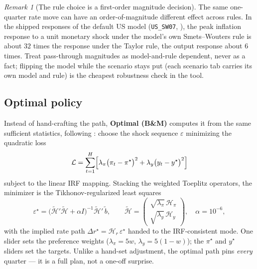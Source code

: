 \documentclass[11pt]{article}
\newcommand{\ui}[1]{\textbf{#1}}
\theoremstyle{plain}
\theoremstyle{remark}
\newtheorem{remark}{Remark}
\begin{document}
\begin{remark}[The rule choice is a first-order magnitude decision]\label{rem:rulescale}
The same one-quarter rate move can have an order-of-magnitude different
effect across rules. In the shipped responses of the default US model
(\texttt{US\_SW07}, \citealp{SmetsWouters2007}), the peak inflation
response to a unit monetary shock under the model's own Smets--Wouters
rule is about $32$ times the response under the Taylor rule, the output
response about $6$ times. Treat pass-through magnitudes as
model-and-rule dependent, never as a fact; flipping the model while the
scenario stays put (each scenario tab carries its own model and rule) is
the cheapest robustness check in the tool.
\end{remark}

\subsection{Optimal policy}\label{sec:bm}

Instead of hand-crafting the path, \ui{Optimal (B\&M)} computes it from
the same sufficient statistics, following
\citet{BarnichonMesters2023}: choose the shock sequence
$\varepsilon$ minimizing the quadratic loss
\begin{equation}\label{eq:bmloss}
  \mathcal{L} = \sum_{t=1}^{H}\Bigl[
    \lambda_\pi\bigl(\pi_t - \pi^\star\bigr)^2
    + \lambda_y\bigl(y_t - y^\star\bigr)^2\Bigr]
\end{equation}
subject to the linear IRF mapping. Stacking the weighted Toeplitz
operators, the minimizer is the Tikhonov-regularized least squares
\begin{equation}\label{eq:bmsolve}
  \varepsilon^\star
  = \bigl(\tilde{\mathcal H}'\tilde{\mathcal H} + \alpha I\bigr)^{-1}
    \tilde{\mathcal H}'\,\tilde b,
  \qquad
  \tilde{\mathcal H} =
  \begin{pmatrix}\sqrt{\lambda_\pi}\,\mathcal H_\pi\\
                 \sqrt{\lambda_y}\,\mathcal H_y\end{pmatrix},
  \quad \alpha = 10^{-6},
\end{equation}
with the implied rate path $\Delta r^\star = \mathcal H_r\,
\varepsilon^\star$ handed to the IRF-consistent mode. One slider sets
the preference weights ($\lambda_\pi = 5w$,
$\lambda_y = 5(1-w)$); the $\pi^\star$ and $y^\star$ sliders set the
targets. Unlike a hand-set adjustment, the optimal path pins
\emph{every} quarter --- it is a full plan, not a one-off surprise.
\end{document}
